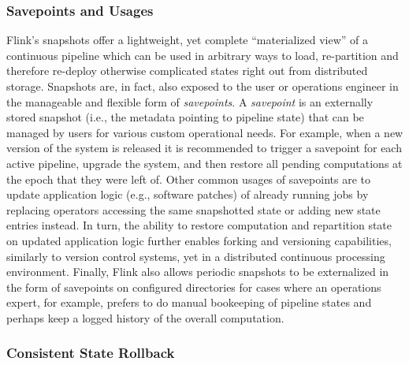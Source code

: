 \subsubsection{Savepoints and Usages}
Flink's snapshots offer a lightweight, yet complete ``materialized view'' of a continuous pipeline which can be used in arbitrary ways to load, re-partition and therefore re-deploy otherwise complicated states right out from distributed storage. Snapshots are, in fact, also exposed to the user or operations engineer in the manageable and flexible form of \emph{savepoints}. A \emph{savepoint} is an externally stored snapshot (i.e., the metadata pointing to pipeline state) that can be managed by users for various custom operational needs. For example, when a new version of the system is released it is recommended to trigger a savepoint for each active pipeline, upgrade the system, and then restore all pending computations at the epoch that they were left of. Other common usages of savepoints are to update application logic (e.g., software patches) of already running jobs by replacing operators accessing the same snapshotted state or adding new state entries instead. In turn, the ability to restore computation and repartition state on updated application logic further enables forking and versioning capabilities, similarly to version control systems, yet in a distributed continuous processing environment. Finally, Flink also allows periodic snapshots to be externalized in the form of savepoints on configured directories for cases where an operations expert, for example, prefers to do manual bookeeping of pipeline states and perhaps keep a logged history of the overall computation. 

\subsubsection{Consistent State Rollback}




